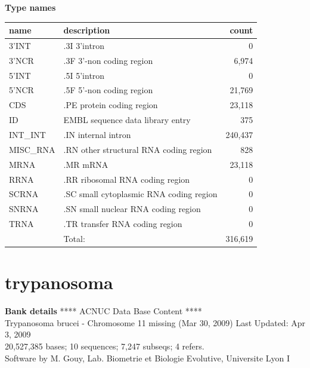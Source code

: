 \documentclass{article}
\begin{document}
\begin{Schunk}
\textbf{Type names}
\noindent\begin{tabular}{llr}
\hline \hline
name & description & count \\
\hline
3'INT  &  .3I 3'intron  &  0 \\
3'NCR  &  .3F  3'-non coding region  &  6,974 \\
5'INT  &  .5I 5'intron  &  0 \\
5'NCR  &  .5F  5'-non coding region  &  21,769 \\
CDS  &  .PE protein coding region  &  23,118 \\
ID  &  EMBL sequence data library entry  &  375 \\
INT\_INT  &  .IN  internal intron  &  240,437 \\
MISC\_RNA  &  .RN other structural RNA coding region  &  828 \\
MRNA  &  .MR mRNA  &  23,118 \\
RRNA  &  .RR ribosomal RNA coding region  &  0 \\
SCRNA  &  .SC small cytoplasmic RNA coding region  &  0 \\
SNRNA  &  .SN small nuclear RNA coding region  &  0 \\
TRNA  &  .TR transfer RNA coding region  &  0 \\
\hline
 & Total: & 316,619 \\
\hline \hline
\end{tabular}

\section{ trypanosoma }
\textbf{Bank details}
             ****     ACNUC Data Base Content      ****                         \\
Trypanosoma brucei - Chromosome 11 missing (Mar 30, 2009) Last Updated: Apr  3, 2009\\
20,527,385 bases; 10 sequences; 7,247 subseqs; 4 refers.\\
Software by M. Gouy, Lab. Biometrie et Biologie Evolutive, Universite Lyon I 


\end{Schunk}
\end{document}
